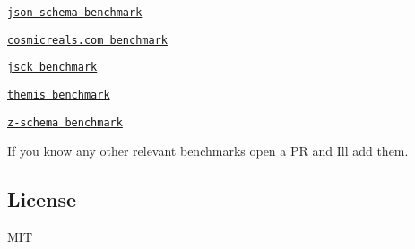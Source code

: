 \begin{DoxyItemize}
\item \href{https://github.com/Muscula/json-schema-benchmark}{\tt json-\/schema-\/benchmark}
\item \href{http://cosmicrealms.com/blog/2014/08/29/benchmark-of-node-dot-js-json-validation-modules-part-3/}{\tt cosmicreals.\+com benchmark}
\item \href{https://github.com/pandastrike/jsck/issues/72#issuecomment-70992684}{\tt jsck benchmark}
\item \href{https://cdn.rawgit.com/playlyfe/themis/master/benchmark/results.html}{\tt themis benchmark}
\item \href{https://rawgit.com/zaggino/z-schema/master/benchmark/results.html}{\tt z-\/schema benchmark}
\end{DoxyItemize}

If you know any other relevant benchmarks open a PR and I\textquotesingle{}ll add them.

\subsection*{License}

M\+IT 